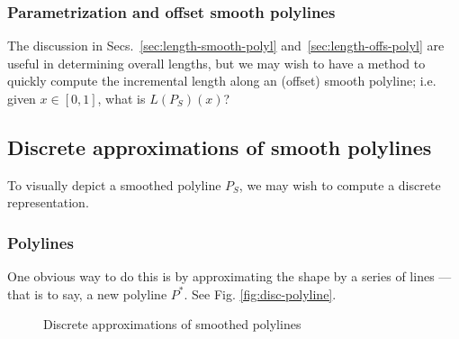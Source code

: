 \documentclass{article}
\begin{document}
\subsubsection{Parametrization and offset smooth polylines}
%
The discussion in Secs.~\ref{sec:length-smooth-polyl} and~\ref{sec:length-offs-polyl} are useful in determining overall lengths, but we may wish to have a method to quickly compute the incremental length along an (offset) smooth polyline; i.e. given $x \in \left[0, 1\right]$, what is $L\left(P_S\right)\left(x\right)$?
%
\subsection{Discrete approximations of smooth polylines}
%
To visually depict a smoothed polyline $P_S$, we may wish to compute a discrete representation.
%
\subsubsection{Polylines}
%
One obvious way to do this is by approximating the shape by a series of lines --- that is to say, a new polyline $P^*$.  See Fig. \ref{fig:disc-polyline}.
%
\begin{figure}
  \centering
  \hfill
  \caption{Discrete approximations of smoothed polylines}
\end{figure}
\end{document}

